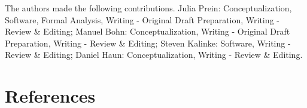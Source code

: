 \documentclass[
  man,floatsintext]{apa6}
\begin{document}
The authors made the following contributions.
Julia Prein: Conceptualization, Software, Formal Analysis, Writing - Original Draft Preparation, Writing - Review \& Editing; Manuel Bohn: Conceptualization, Writing - Original Draft Preparation, Writing - Review \& Editing; Steven Kalinke: Software, Writing - Review \& Editing; Daniel Haun: Conceptualization, Writing - Review \& Editing.

\newpage

\hypertarget{references}{%
\section{References}\label{references}}

\begingroup
\setlength{\parindent}{-0.5in}
\setlength{\leftskip}{0.5in}

\hypertarget{refs}{}
\end{document}
